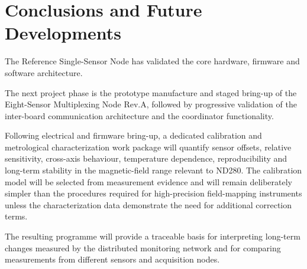 \chapter{Conclusions and Future Developments}

The Reference Single-Sensor Node has validated the core hardware, firmware and software architecture.

The next project phase is the prototype manufacture and staged bring-up of the Eight-Sensor Multiplexing Node Rev.A, followed by progressive validation of the inter-board communication architecture and the coordinator functionality.

Following electrical and firmware bring-up, a dedicated calibration and metrological characterization work package will quantify sensor offsets, relative sensitivity, cross-axis behaviour, temperature dependence, reproducibility and long-term stability in the magnetic-field range relevant to ND280. The calibration model will be selected from measurement evidence and will remain deliberately simpler than the procedures required for high-precision field-mapping instruments unless the characterization data demonstrate the need for additional correction terms.

The resulting programme will provide a traceable basis for interpreting long-term changes measured by the distributed monitoring network and for comparing measurements from different sensors and acquisition nodes.
